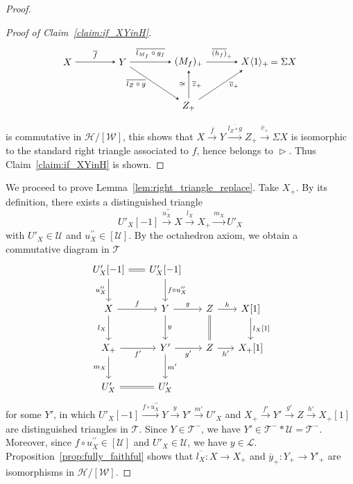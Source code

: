 \documentclass[a4paper,reqno,10pt]{amsart}
\theoremstyle{definition}
\theoremstyle{definition}
\theoremstyle{definition}
\theoremstyle{definition}
\theoremstyle{plain}
\newcommand{\CH}{\mathcal{H}}
\newcommand{\CL}{\mathcal{L}}
\newcommand{\CT}{\mathcal{T}}
\newcommand{\CU}{\mathcal{U}}
\newcommand{\CW}{\mathcal{W}}
\begin{document}
\begin{proof}
\begin{proof}[Proof of Claim~\ref{claim:if_XYinH}]
\[
\begin{tikzpicture}[>=stealth]
\node (1) at (-3.2,0.8) {$X$};
\node (2) at (-1.2,0.8) {$Y$};
\node (3) at (1.2,0.8) {$(M_f)_+$};
\node (4) at (3.6,0.8) {$X\langle1\rangle_+$};
\node (5) at (1.2,-0.8) {$Z_+$};
\node (6) at (4.64,0.82) {$=\Sigma X$};
\draw[->] (1) -- node[above,font=\scriptsize] {$\overline{f}$} (2);
\draw[->] (2) -- node[above,font=\scriptsize] {$\overline{l_{M_f}\circ g_f}$} (3);
\draw[->] (3) -- node[above,font=\scriptsize] {$\overline{(h_f)}_+$} (4);
\draw[->] (2) -- node[left,font=\scriptsize] {$\overline{l_Z\circ g}\ \ $} (5);
\draw[->] (5) -- node[left,font=\scriptsize] {$\cong$} node[right,font=\scriptsize] {$\overline{z}_+$} (3);
\draw[->] (5) -- node[right,font=\scriptsize] {$\ \ \overline{v}_+$} (4);
\end{tikzpicture}
\]
is commutative in $\CH/[\CW]$, this shows that $X\xrightarrow{\overline{f}}Y\xrightarrow{\overline{l_Z\circ g}}Z_+\xrightarrow{\overline{v}_+}\Sigma X$ is isomorphic to the standard right triangle associated to $f$, hence belongs to $\vartriangleright$. Thus Claim~\ref{claim:if_XYinH} is shown.
\end{proof}
We proceed to prove Lemma~\ref{lem:right_triangle_replace}. Take $X_+$. By its definition, there exists a distinguished triangle
\[ U'_X[-1]\xrightarrow{u_X^{\prime\prime}}X\xrightarrow{l_X}X_+\xrightarrow{m_X}U'_X \]
 with $U'_X\in\CU$ and $u_X^{\prime\prime}\in[\CU]$.
By the octahedron axiom, we obtain a commutative diagram in $\CT$
\begin{equation}\label{octa:X_+}
\begin{tikzcd}[row sep=0.8cm, column sep=0.6cm]
U'_X[-1]\arrow{d}[swap]{u_X^{\prime\prime}}\arrow[equal]{r}{}
&U'_X[-1] \arrow{d}{f\circ u_X^{\prime\prime}}
\\
X \arrow{r}{f}\arrow{d}[swap]{l_X}
&Y \arrow{d}{y} \arrow{r}{g}
&Z \arrow{r}{h} \arrow[equal]{d}{}
&X[1] \arrow{d}{l_X[1]}
\\
X_+\arrow{r}[swap]{f'}\arrow{d}[swap]{m_X}
&Y' \arrow{d}{m'} \arrow{r}[swap]{g'}
&Z \arrow{r}[swap]{h'}
&X_+[1]
\\
U'_X \arrow[equal]{r}
&U'_X
\end{tikzcd}
\end{equation}
for some $Y'$, in which $U'_X[-1]\xrightarrow{f\circ u_X^{\prime\prime}}Y\xrightarrow{y}Y'\xrightarrow{m'} U'_X$ and $X_+\xrightarrow{f'}Y'\xrightarrow{g'}Z\xrightarrow{h'} X_+[1]$ are distinguished triangles in $\CT$. Since $Y\in\CT^-$, we have $Y'\in \CT^-\ast\CU=\CT^-$. Moreover, since $f\circ u_X^{\prime\prime}\in[\CU]$ and $U'_X\in\CU$, we have $y\in\CL$. Proposition~\ref{prop:fully_faithful} shows that \color{blue}
$\overline{l_X}\colon X\to X_+$ 
\normalcolor
and $\overline{y}_+\colon Y_+\to Y'_+$ are isomorphisms in $\CH/[\CW]$. 


\end{proof}
\end{document}
